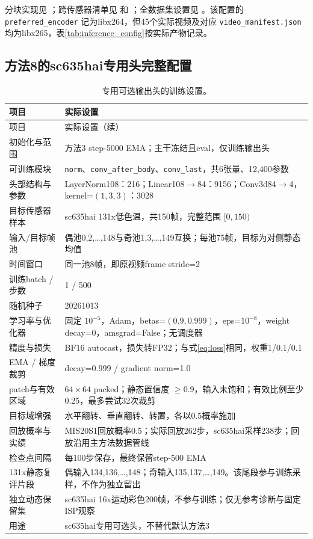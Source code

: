 \documentclass[11pt,a4paper,UTF8,fontset=fandol]{ctexart}
\begin{document}
分块实现见 ；跨传感器清单见  和 ；全数据集设置见 。该配置的 \texttt{preferred\_encoder} 记为libx264，但45个实际视频及对应 \texttt{video\_manifest.json} 均为libx265，表\ref{tab:inference_config}按实际产物记录。

\subsection{方法8的sc635hai专用头完整配置}

\begin{longtable}{P{0.27\textwidth}P{0.65\textwidth}}
\caption{专用可选输出头的训练设置。}\label{tab:head_config}\\
\toprule 项目 & 实际设置 \\ \midrule
\endfirsthead
\toprule 项目 & 实际设置（续） \\ \midrule
\endhead
\bottomrule\endfoot
初始化与范围 & 方法3 step-5000 EMA；主干冻结且eval，仅训练输出头 \\
可训练模块 & \texttt{norm}、\texttt{conv\_after\_body}、\texttt{conv\_last}，共6张量、12,400参数 \\
头部结构与参数 & LayerNorm108：216；Linear108$\to$84：9156；Conv3d84$\to$4，kernel=$(1,3,3)$：3028 \\
目标传感器样本 & sc635hai 131x低色温，共150帧，完整范围 $[0,150)$ \\
输入/目标帧池 & 偶池0,2,\ldots,148与奇池1,3,\ldots,149互换；每池75帧，目标为对侧静态均值 \\
时间窗口 & 同一池8帧，即原视频frame stride=2 \\
训练batch / 步数 & 1 / 500 \\
随机种子 & 20261013 \\
学习率与优化器 & 固定 $10^{-5}$，Adam，betas=$(0.9,0.999)$，eps=$10^{-8}$，weight decay=0，amsgrad=False；无调度器 \\
精度与损失 & BF16 autocast，损失转FP32；与式\eqref{eq:loss}相同，权重1/0.1/0.1 \\
EMA / 梯度裁剪 & decay=0.999 / gradient norm=1.0 \\
patch与有效区域 & $64\times64$ packed；静态置信度 $\ge0.9$，输入未饱和；有效比例至少0.25，最多尝试32次裁剪 \\
目标域增强 & 水平翻转、垂直翻转、转置，各以0.5概率施加 \\
回放概率与实绩 & MIS20S1回放概率0.5；实际回放262步，sc635hai采样238步；回放沿用主方法数据管线 \\
检查点间隔 & 每100步保存，最终保留step-500 EMA \\
131x静态复评片段 & 偶输入134,136,\ldots,148；奇输入135,137,\ldots,149。该尾段参与训练采样，不作为独立留出 \\
独立动态保留集 & sc635hai 16x运动彩色200帧，不参与训练；仅无参考诊断与固定ISP观察 \\
用途 & sc635hai专用可选头，不替代默认方法3 \\
\end{longtable}
\end{document}
